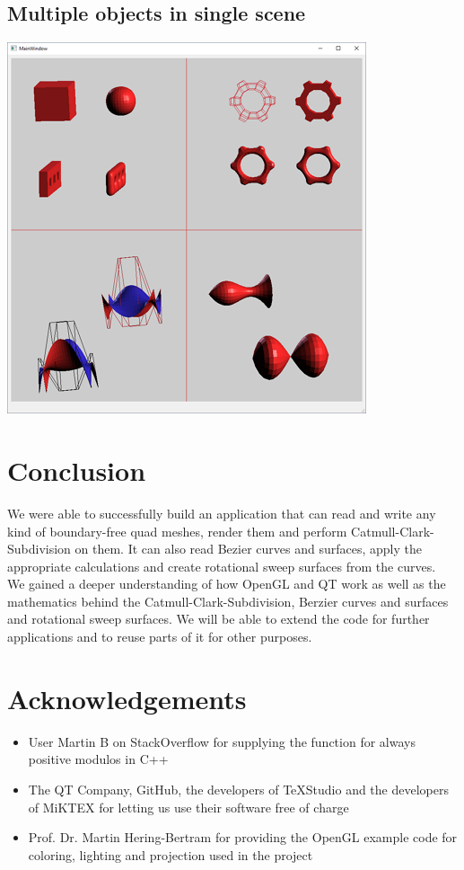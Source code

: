 \documentclass[12pt,a4paper]{scrartcl}
\begin{document}
\subsection{Multiple objects in single scene}
\begin{center}
	\includegraphics[width=400px]{Images/scene.png} 
\end{center}

\section{Conclusion}
We were able to successfully build an application that can read and write any kind of boundary-free quad meshes, render them and perform Catmull-Clark-Subdivision on them. It can also read Bezier curves and surfaces, apply the appropriate calculations and create rotational sweep surfaces from the curves. \\
We gained a deeper understanding of how OpenGL and QT work as well as the mathematics behind the Catmull-Clark-Subdivision, Berzier curves and surfaces and rotational sweep surfaces. We will be able to extend the code for further applications and to reuse parts of it for other purposes.

\section{Acknowledgements}
\begin{itemize}
	\item User Martin B on StackOverflow for supplying the function for always positive modulos in C++
	\item The QT Company, GitHub, the developers of TeXStudio and the developers of MiKTEX for letting us use their software free of charge
	\item Prof. Dr. Martin Hering-Bertram for providing the OpenGL example code for coloring, lighting and projection used in the project
\end{itemize}
\end{document}
